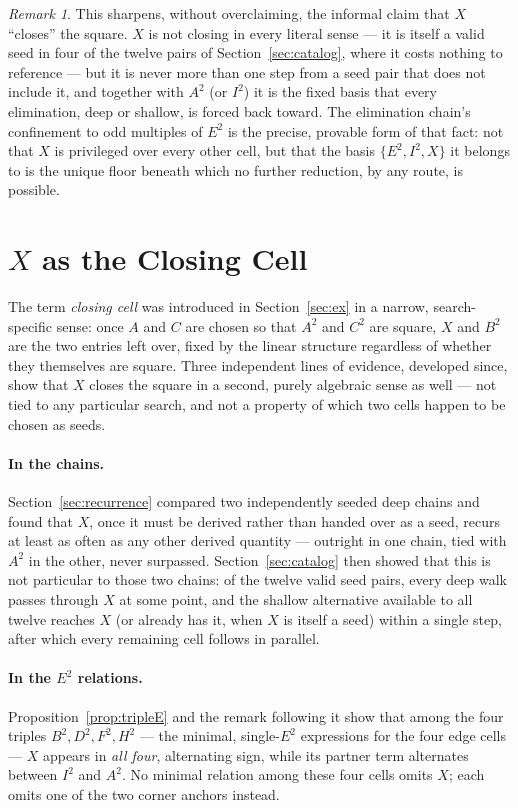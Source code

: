 \documentclass[12pt]{article}
\theoremstyle{remark}
\newtheorem{remark}[theorem]{Remark}
\begin{document}
\begin{remark}
This sharpens, without overclaiming, the informal claim that $X$
``closes'' the square. $X$ is not closing in every literal sense ---
it is itself a valid seed in four of the twelve pairs of
Section~\ref{sec:catalog}, where it costs nothing to reference --- but
it is never more than one step from a seed pair that does not include
it, and together with $A^2$ (or $I^2$) it is the fixed basis that
every elimination, deep or shallow, is forced back toward. The
elimination chain's confinement to odd multiples of $E^2$ is the
precise, provable form of that fact: not that $X$ is privileged over
every other cell, but that the basis $\{E^2,I^2,X\}$ it belongs to is
the unique floor beneath which no further reduction, by any route, is
possible.
\end{remark}

\section{$X$ as the Closing Cell}\label{sec:xclosing}

The term \emph{closing cell} was introduced in Section~\ref{sec:ex} in
a narrow, search-specific sense: once $A$ and $C$ are chosen so that
$A^2$ and $C^2$ are square, $X$ and $B^2$ are the two entries left
over, fixed by the linear structure regardless of whether they
themselves are square. Three independent lines of evidence, developed
since, show that $X$ closes the square in a second, purely algebraic
sense as well --- not tied to any particular search, and not a
property of which two cells happen to be chosen as seeds.

\paragraph{In the chains.} Section~\ref{sec:recurrence} compared two
independently seeded deep chains and found that $X$, once it must be
derived rather than handed over as a seed, recurs at least as often as
any other derived quantity --- outright in one chain, tied with $A^2$
in the other, never surpassed. Section~\ref{sec:catalog} then showed
that this is not particular to those two chains: of the twelve valid
seed pairs, every deep walk passes through $X$ at some point, and the
shallow alternative available to all twelve reaches $X$ (or already
has it, when $X$ is itself a seed) within a single step, after which
every remaining cell follows in parallel.

\paragraph{In the $E^2$ relations.} Proposition~\ref{prop:tripleE} and
the remark following it show that among the four triples
$B^2,D^2,F^2,H^2$ --- the minimal, single-$E^2$ expressions for the
four edge cells --- $X$ appears in \emph{all four}, alternating sign,
while its partner term alternates between $I^2$ and $A^2$. No minimal
relation among these four cells omits $X$; each omits one of the two
corner anchors instead.
\end{document}
